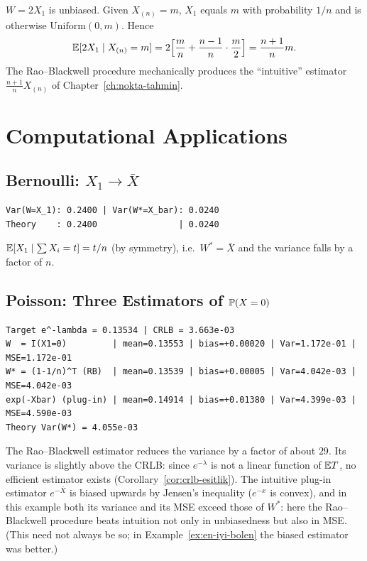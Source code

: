 \documentclass[main.tex]{subfiles}
\begin{document}
\begin{example}
$W=2X_1$ is unbiased. Given $X_{(n)}=m$, $X_1$ equals $m$ with probability $1/n$ and is otherwise $\text{Uniform}(0,m)$. Hence
\[
\E[2X_1\mid X_{(n)}=m]=2\Big[\frac mn+\frac{n-1}{n}\cdot\frac m2\Big]=\frac{n+1}{n}m .
\]
The Rao--Blackwell procedure mechanically produces the ``intuitive'' estimator $\frac{n+1}{n}X_{(n)}$ of Chapter~\ref{ch:nokta-tahmin}.
\end{example}

\section{Computational Applications}

\subsection{Bernoulli: $X_1\to\bar X$}

\begin{lstlisting}[style=output]
Var(W=X_1): 0.2400 | Var(W*=X_bar): 0.0240
Theory    : 0.2400                | 0.0240
\end{lstlisting}

$\E[X_1\mid\sum X_i=t]=t/n$ (by symmetry), i.e.\ $W^*=\bar X$ and the variance falls by a factor of $n$.

\subsection{Poisson: Three Estimators of $\P(X=0)$}

\begin{lstlisting}[style=output]
Target e^-lambda = 0.13534 | CRLB = 3.663e-03
W  = I(X1=0)         | mean=0.13553 | bias=+0.00020 | Var=1.172e-01 | MSE=1.172e-01
W* = (1-1/n)^T (RB)  | mean=0.13539 | bias=+0.00005 | Var=4.042e-03 | MSE=4.042e-03
exp(-Xbar) (plug-in) | mean=0.14914 | bias=+0.01380 | Var=4.399e-03 | MSE=4.590e-03
Theory Var(W*) = 4.055e-03
\end{lstlisting}

The Rao--Blackwell estimator reduces the variance by a factor of about $29$. Its variance is slightly above the CRLB: since $e^{-\lambda}$ is not a linear function of $\E T$, no efficient estimator exists (Corollary~\ref{cor:crlb-esitlik}). The intuitive plug-in estimator $e^{-\bar X}$ is biased upwards by Jensen's inequality ($e^{-x}$ is convex), and in this example both its variance and its MSE exceed those of $W^*$: here the Rao--Blackwell procedure beats intuition not only in unbiasedness but also in MSE. (This need not always be so; in Example~\ref{ex:en-iyi-bolen} the biased estimator was better.)
\end{document}

